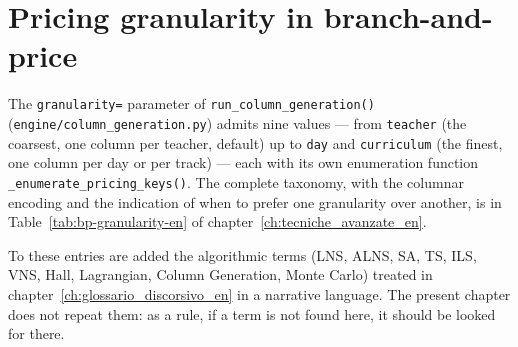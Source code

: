 \section{Pricing granularity in branch-and-price}


The \texttt{granularity=} parameter of
\texttt{run\_column\_generation()}
(\texttt{engine/column\_generation.py}) admits nine values ---
from \texttt{teacher} (the coarsest, one column per teacher,
default) up to \texttt{day} and \texttt{curriculum} (the finest,
one column per day or per track) --- each with its own enumeration
function \texttt{\_enumerate\_pricing\_keys()}. The complete
taxonomy, with the columnar encoding and the indication of when to
prefer one granularity over another, is in
Table~\ref{tab:bp-granularity-en} of
chapter~\ref{ch:tecniche_avanzate_en}.

\fleuron

To these entries are added the algorithmic terms
(LNS, ALNS, SA, TS, ILS, VNS, Hall, Lagrangian, Column
Generation, Monte Carlo) treated in
chapter~\ref{ch:glossario_discorsivo_en} in a narrative language.
The present chapter does not repeat them: as a rule, if a term is
not found here, it should be looked for there.
